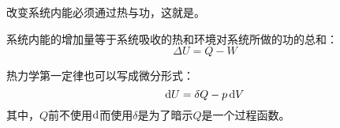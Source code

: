             改变系统内能必须通过热与功，这就是。
            \newpage
            \begin{law}
                系统内能的增加量等于系统吸收的热和环境对系统所做的功的总和：
                \begin{equation}
                    \Delta U = Q - W
                    \nonumber
                \end{equation}
            \end{law}
            热力学第一定律也可以写成微分形式：
            \begin{equation}
                \dif{U} = \delta{Q} - p\dif{V}
                \nonumber
            \end{equation}
            其中，$Q$前不使用$\dif$而使用$\delta$是为了暗示$Q$是一个过程函数。
